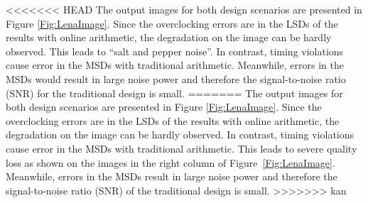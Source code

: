 \documentclass{acm_proc_article-sp}
\begin{document}
<<<<<<< HEAD
The output images for both design scenarios are presented in Figure \ref{Fig:LenaImage}. Since the overclocking errors are in the LSDs of the results with online arithmetic, the degradation on the image can be hardly observed. This leads to ``salt and pepper noise''. In contrast, timing violations cause error in the MSDs with traditional arithmetic.  Meanwhile, errors in the MSDs would result in large noise power and therefore the signal-to-noise ratio (SNR) for the traditional design is small.
=======
The output images for both design scenarios are presented in Figure \ref{Fig:LenaImage}. Since the overclocking errors are in the LSDs of the results with online arithmetic, the degradation on the image can be hardly observed. In contrast, timing violations cause error in the MSDs with traditional arithmetic. This leads to severe quality loss as shown on the images in the right column of Figure~\ref{Fig:LenaImage}. Meanwhile, errors in the MSDs result in large noise power and therefore the signal-to-noise ratio (SNR) of the traditional design is small.\vspace{-1ex}
>>>>>>> kan
\end{document}
